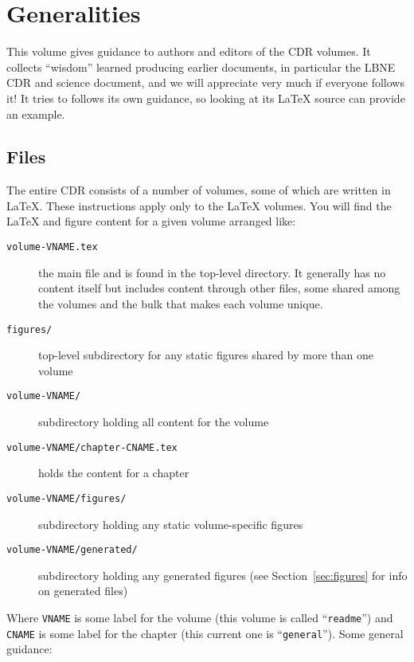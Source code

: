 \chapter{Generalities}
\label{ch:generalities}

This volume gives guidance to authors and editors of the CDR volumes. It collects ``wisdom'' learned 
producing earlier documents, in particular the LBNE CDR and science document, and we will appreciate 
very much if everyone follows it!  It tries to follows its own guidance, so looking at its \LaTeX{} source can 
provide an example.  
\section{Files}
\label{sec:files}

The entire CDR consists of a number of volumes, some of which are written in \LaTeX{}. These instructions apply only to the \LaTeX{} volumes.  You will find the \LaTeX{} and figure content for a given volume arranged like:

\begin{description}
\item[\texttt{volume-VNAME.tex}] the main file and is found in the top-level directory. It generally has no content itself but includes content through other files, some shared among the volumes and the bulk that makes each volume unique. 
\item[\texttt{figures/}] top-level subdirectory for any static figures shared by more than one volume
\item[\texttt{volume-VNAME/}] subdirectory holding all content for the volume
\item[\texttt{volume-VNAME/chapter-CNAME.tex}] holds the content for a chapter
\item[\texttt{volume-VNAME/figures/}] subdirectory holding any static volume-specific figures
\item[\texttt{volume-VNAME/generated/}] subdirectory holding any generated figures (see Section~\ref{sec:figures} for info on generated files)
\end{description}

Where \texttt{VNAME} is some label for the volume (this volume is called ``\texttt{readme}'') and 
\texttt{CNAME} is some label for the chapter (this current one is ``\texttt{general}'').  
Some general guidance:

